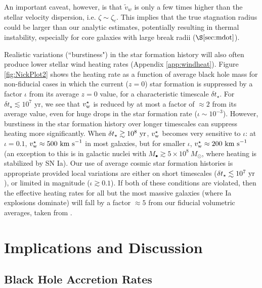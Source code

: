 \documentclass[usenatbib,fleqn]{mn2e}
\newcommand{\vw}{\tilde{v}_{w}}
\begin{document}
An important caveat, however, is that $\vw$ is only a few times higher than the stellar velocity dispersion, i.e. $\zeta \sim \zeta_c$.  This implies that the true stagnation radius could be larger than our analytic estimates, potentially resulting in thermal instability, especially for core galaxies with large break radii ($\S\ref{sec:mdot}$).

Realistic variations (``burstiness") in the star formation history
will also often produce lower stellar wind heating rates (Appendix
\ref{app:windheat}).  Figure \ref{fig:NickPlot2} shows the heating
rate as a function of average black hole mass for non-fiducial cases
in which the current ($z = 0$) star formation is suppressed by a
factor $\iota$ from its average $z = 0$ value, for a characteristic
timescale $\delta t_{\star}$.  For $\delta t_{\star} \lesssim 10^{7}$
yr, we see that $v_{\rm w}^{\star}$ is reduced by at most a factor of
$\approx 2$ from its average value, even for huge drops in the star
formation rate ($\iota \sim 10^{-3}$).  However, burstiness in the
star formation history over longer timescales can suppress heating
more significantly.  When $\delta t_{\star} \gtrsim 10^8~{\rm yr}$,
$v_{\rm w}^\star$ becomes very sensitive to $\iota$: at $\iota=0.1$,
$v_{\rm w}^\star \approx 500~{\rm km~s}^{-1}$ in most galaxies, but
for smaller $\iota$, $v_{\rm w}^\star \approx 200~{\rm km~s}^{-1}$ (an
exception to this is in galactic nuclei with $M_\bullet \gtrsim
5\times 10^8~M_\odot$, where heating is stabilized by SN Ia).  Our use
of average cosmic star formation histories is appropriate provided
local variations are either on short timescales ($\delta t_{\star}
\lesssim 10^7~{\rm yr}$), or limited in magnitude ($\iota \gtrsim
0.1$).  If both of these conditions are violated, then the effective
heating rates for all but the most massive galaxies (where Ia
explosions dominate) will fall by a factor $\approx 5$ from our
fiducial volumetric averages, taken from \citet{MosterNaab+:2013a}.


\section{Implications and Discussion}
\label{sec:discussion}

\subsection{Black Hole Accretion Rates}
\label{sec:mdot}
\end{document}
